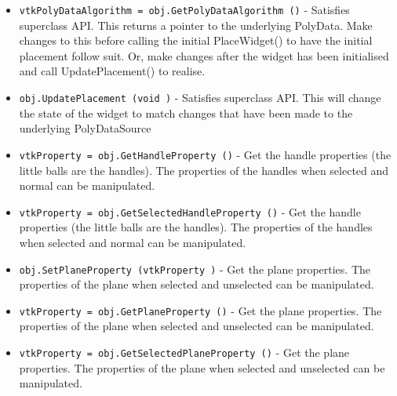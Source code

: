 \begin{itemize}
\item  \verb|vtkPolyDataAlgorithm = obj.GetPolyDataAlgorithm ()| -  Satisfies superclass API.  This returns a pointer to the underlying
 PolyData.  Make changes to this before calling the initial PlaceWidget()
 to have the initial placement follow suit.  Or, make changes after the
 widget has been initialised and call UpdatePlacement() to realise.

\item  \verb|obj.UpdatePlacement (void )| -  Satisfies superclass API.  This will change the state of the widget to
 match changes that have been made to the underlying PolyDataSource

\item  \verb|vtkProperty = obj.GetHandleProperty ()| -  Get the handle properties (the little balls are the handles). The 
 properties of the handles when selected and normal can be 
 manipulated.

\item  \verb|vtkProperty = obj.GetSelectedHandleProperty ()| -  Get the handle properties (the little balls are the handles). The 
 properties of the handles when selected and normal can be 
 manipulated.

\item  \verb|obj.SetPlaneProperty (vtkProperty )| -  Get the plane properties. The properties of the plane when selected 
 and unselected can be manipulated.

\item  \verb|vtkProperty = obj.GetPlaneProperty ()| -  Get the plane properties. The properties of the plane when selected 
 and unselected can be manipulated.

\item  \verb|vtkProperty = obj.GetSelectedPlaneProperty ()| -  Get the plane properties. The properties of the plane when selected 
 and unselected can be manipulated.

\end{itemize}
